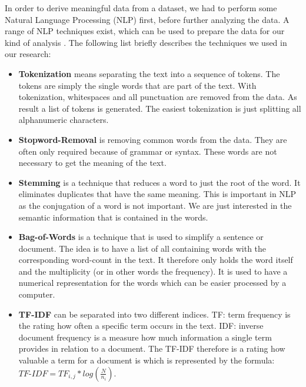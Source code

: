 In order to derive meaningful data from a dataset, we had to perform some Natural Language Processing (NLP) first, before further analyzing the data. A range of NLP techniques exist, which can be used to prepare the data for our kind of analysis \cite{solangi_review_2018}\cite{ferrari_natural_2018}. The following list briefly describes the techniques we used in our research:

\begin{itemize}
	\item \textbf{Tokenization} means separating the text into a sequence of tokens. The tokens are simply the single words that are part of the text. With tokenization, whitespaces and all punctuation are removed from the data. As result a list of tokens is generated. The easiest tokenization is just splitting all alphanumeric characters. \cite{solangi_review_2018}
	\item \textbf{Stopword-Removal} is removing common words from the data. They are often only required because of grammar or syntax. These words are not necessary to get the meaning of the text. \cite{mhatre_dimensionality_2017}
	\item \textbf{Stemming} is a technique that reduces a word to just the root of the word. It eliminates duplicates that have the same meaning. This is important in NLP as the conjugation of a word is not important. We are just interested in the semantic information that is contained in the words. \cite{mhatre_dimensionality_2017}
	\item \textbf{Bag-of-Words} is a technique that is used to simplify a sentence or document. The idea is to have a list of all containing words with the corresponding word-count in the text. It therefore only holds the word itself and the multiplicity (or in other words the frequency). It is used to have a numerical representation for the words which can be easier processed by a computer. \cite{mikolov_efficient_2013}
	\item \textbf{TF-IDF} can be separated into two different indices. TF: term frequency is the rating how often a specific term occurs in the text. IDF: inverse document frequency is a measure how much information a single term provides in relation to a document. \cite{leskovec_data_2014} The TF-IDF therefore is a rating how valuable a term for a document is which is represented by the formula: ${TF\text{-}IDF}=TF_{i,j} * log(\frac{N}{n_{i}})$.
\end{itemize}